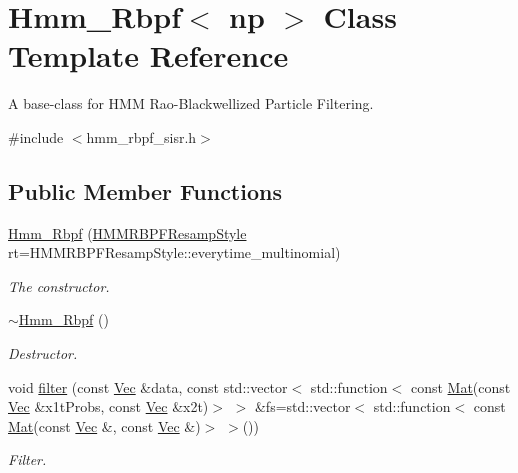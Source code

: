 \hypertarget{classHmm__Rbpf}{}\section{Hmm\+\_\+\+Rbpf$<$ np $>$ Class Template Reference}
\label{classHmm__Rbpf}


A base-\/class for H\+MM Rao-\/\+Blackwellized Particle Filtering.  




{\ttfamily \#include $<$hmm\+\_\+rbpf\+\_\+sisr.\+h$>$}

\subsection*{Public Member Functions}
\begin{DoxyCompactItemize}
\item 
\hyperlink{classHmm__Rbpf_a5f6b635ecde176edefd4709132a49f74}{Hmm\+\_\+\+Rbpf} (\hyperlink{hmm__rbpf__sisr_8h_aa0729d190f1f8b76b203466a41f1505f}{H\+M\+M\+R\+B\+P\+F\+Resamp\+Style} rt=H\+M\+M\+R\+B\+P\+F\+Resamp\+Style\+::everytime\+\_\+multinomial)
\begin{DoxyCompactList}\small\item\em The constructor. \end{DoxyCompactList}\item 
\hyperlink{classHmm__Rbpf_a6a5a602ca9be58ac12a4fb2545ebd2cc}{$\sim$\+Hmm\+\_\+\+Rbpf} ()
\begin{DoxyCompactList}\small\item\em Destructor. \end{DoxyCompactList}\item 
void \hyperlink{classHmm__Rbpf_a874a9cbd4cb5d6c3961624bb3e08fa4c}{filter} (const \hyperlink{apf__filter_8h_a4c7df05c6f5e8a0d15ae14bcdbc07152}{Vec} \&data, const std\+::vector$<$ std\+::function$<$ const \hyperlink{apf__filter_8h_ae601f56a556993079f730483c574356f}{Mat}(const \hyperlink{apf__filter_8h_a4c7df05c6f5e8a0d15ae14bcdbc07152}{Vec} \&x1t\+Probs, const \hyperlink{apf__filter_8h_a4c7df05c6f5e8a0d15ae14bcdbc07152}{Vec} \&x2t)$>$ $>$ \&fs=std\+::vector$<$ std\+::function$<$ const \hyperlink{apf__filter_8h_ae601f56a556993079f730483c574356f}{Mat}(const \hyperlink{apf__filter_8h_a4c7df05c6f5e8a0d15ae14bcdbc07152}{Vec} \&, const \hyperlink{apf__filter_8h_a4c7df05c6f5e8a0d15ae14bcdbc07152}{Vec} \&)$>$ $>$())
\begin{DoxyCompactList}\small\item\em Filter. \end{DoxyCompactList}\item 

\end{DoxyCompactItemize}
